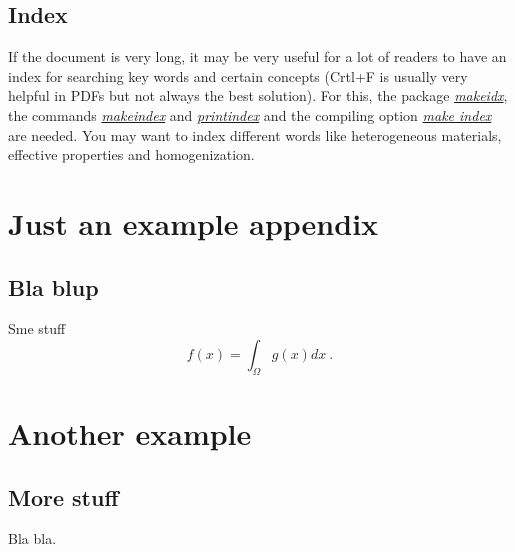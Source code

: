 \documentclass[a4paper,11pt,oneside]{book}
\newcommand{\imp}[1]{\underline{\textit{#1}}}
\begin{document}
\section{Index}

If the document is very long, it may be very useful for a lot of readers to have an index for searching key words and certain concepts (Crtl+F is usually very helpful in PDFs but not always the best solution). For this, the  package \imp{makeidx}, the commands \imp{makeindex} and \imp{printindex} and the compiling option \imp{make index} are needed. You may want to index different words like heterogeneous materials, effective properties and homogenization.


\begin{appendix}
	
	
	\chapter{Just an example appendix}
	\label{app_ex1}
	
	
	\section{Bla blup}
	
	Sme stuff
	\begin{equation}
	f(x) = \int_{\Omega} g(x) dx \ .
	\end{equation}
	
	
	\chapter{Another example}
	\label{app_ex2}
	
	
	\section{More stuff}
	
	Bla bla.
	
\end{appendix}
\end{document}
